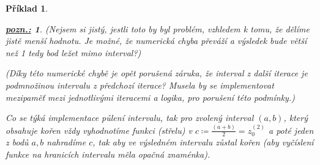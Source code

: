 \documentclass{article}
\newtheorem{example}{Příklad}
\newtheorem*{remark}{\underline{\it pozn.:}}
\begin{document}
\begin{example}
\begin{remark}
		(Nejsem si jistý, jestli toto by byl problém, vzhledem k tomu, že dělíme jistě menší hodnotu. Je možné, že numerická chyba převáží a výsledek bude větší než 1 tedy bod ležet mimo interval?)

		(Díky této numerické chybě je opět porušená záruka, že interval z další iterace je podmnožinou intervalu z předchozí iterace? Musela by se implementovat mezipaměť mezi jednotlivými iteracemi a logika, pro porušení této podmínky.)
	\end{remark}

	Co se týká implementace půlení intervalu, tak pro zvolený interval $(a,b)$, který obsahuje kořen vždy vyhodnotíme funkci (střelu) v $ c \coloneqq \frac{(a+b)}{2} = z^{(2)}_{0}$ a poté jeden z bodů $a,b$ nahradíme $c$, tak aby ve výsledném intervalu zůstal kořen (aby vyčíslení funkce na hranicích intervalu měla opačná znaménka).\pagebreak
\end{example}
\end{document}
